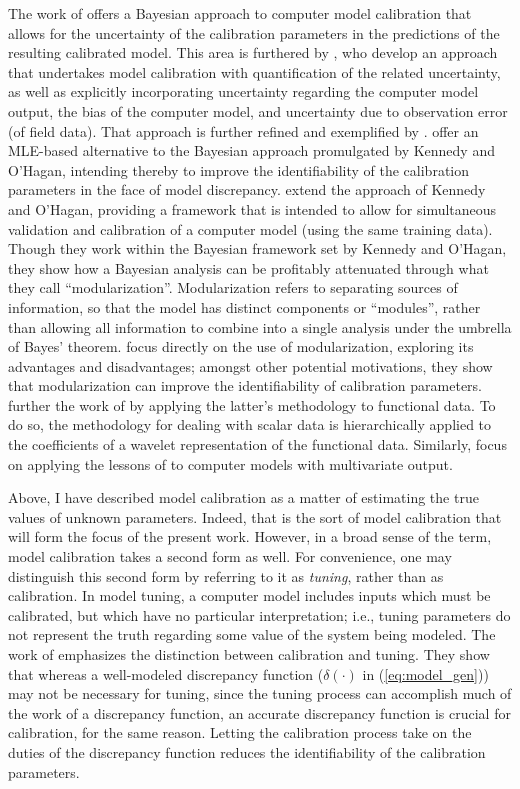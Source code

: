 \documentclass{article}
\begin{document}
The work of \cite{Kennedy2001} offers a Bayesian approach to computer model calibration that allows for the uncertainty of the calibration parameters in the predictions of the resulting calibrated model. 
This area is furthered by \cite{Higdon2004}, who develop an approach that undertakes model calibration with quantification of the related uncertainty, as well as explicitly incorporating uncertainty regarding the computer model output, the bias of the computer model, and uncertainty due to observation error (of field data). 
That approach is further refined and exemplified by \cite{Williams2006}.
\cite{Loeppky2006} offer an MLE-based alternative to the Bayesian approach promulgated by Kennedy and O'Hagan, intending thereby to improve the identifiability of the calibration parameters in the face of model discrepancy. 
\cite{Bayarri2007} extend the approach of Kennedy and O'Hagan, providing a framework that is intended to allow for simultaneous validation and calibration of a computer model (using the same training data). 
Though they  work within the Bayesian framework set by Kennedy and O'Hagan, they show how a Bayesian analysis can be profitably attenuated through what they call ``modularization''. 
Modularization refers to separating sources of information, so that the model has distinct components or ``modules'', rather than allowing all information to combine into a single analysis under the umbrella of Bayes' theorem. \cite{Liu2009} focus directly on the use of modularization, exploring its advantages and disadvantages; amongst other potential motivations, they show that modularization can improve the identifiability of calibration parameters. 
\cite{Bayarri} further the work of \cite{Bayarri2007} by applying the latter's methodology to functional data. 
To do so, the methodology for dealing with scalar data is hierarchically applied to the coefficients of a wavelet representation of the functional data. Similarly, \cite{Paulo2012} focus on applying the lessons of \cite{Bayarri2007} to computer models with multivariate output.

Above, I have described model calibration as a matter of estimating the true values of unknown parameters. Indeed, that is the sort of model calibration that will form the focus of the present work. However, in a broad sense of the term, model calibration takes a second form as well. For convenience, one may distinguish this second form by referring to it as \emph{tuning}, rather than as calibration. In model tuning, a computer model includes inputs which must be calibrated, but which have no particular interpretation; i.e., tuning parameters do not represent the truth regarding some value of the system being modeled. The work of \cite{Brynjarsdottir2014} emphasizes the distinction between calibration and tuning. They show that whereas a well-modeled discrepancy function ($\delta(\cdot)$ in (\ref{eq:model_gen})) may not be necessary for tuning, since the tuning process can accomplish much of the work of a discrepancy function, an accurate discrepancy function is crucial for calibration, for the same reason. Letting the calibration process take on the duties of the discrepancy function reduces the identifiability of the calibration parameters.
\end{document}
